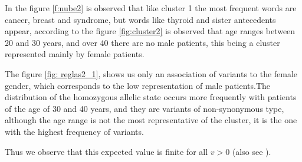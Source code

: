 \documentclass[twocolumn]{bmcart}%
\begin{document}
In the figure \ref{f:nube2} is observed that like cluster 1 the most frequent words are cancer, breast and syndrome, but words like thyroid and sister antecedents appear, according to the figure \ref{fig:cluster2} is observed that age ranges between 20 and 30 years, and over 40 there are no male patients, this being a cluster represented mainly by female patients.

The figure \ref{fig: reglas2_1}, shows us only an association of variants to the female gender, which corresponds to the low representation of male patients.The distribution of the homozygous allelic state occurs more frequently with patients of the age of 30 and 40 years, and they are variants of non-synonymous type, although the age range is not the most representative of the cluster, it is the one with the highest frequency of variants.


Thus we observe that this expected value is finite for all $v>0$ (also see \cite{koon,khar,zvai,xjon,marg}).

\end{document}
